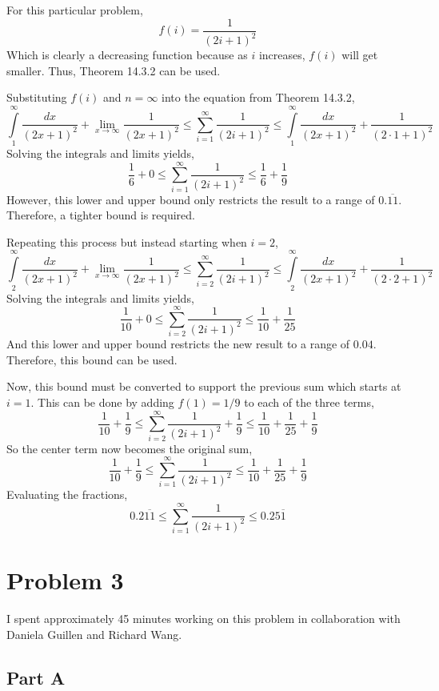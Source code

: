 \documentclass{article}
\begin{document}
For this particular problem,
$$ f(i) = \frac{1}{(2i + 1)^2} $$
Which is clearly a decreasing function because as $i$ increases, $f(i)$ will get
smaller. Thus, Theorem 14.3.2 can be used.

Substituting $f(i)$ and $n = \infty$ into the equation from Theorem 14.3.2,
$$ \int\limits_1^\infty \frac{dx}{(2x + 1)^2} + \lim_{x \to \infty} \frac{1}{(2x
+ 1)^2} \leq \sum\limits_{i=1}^{\infty} \frac{1}{(2i + 1)^2} \leq
\int\limits_1^\infty \frac{dx}{(2x + 1)^2} + \frac{1}{(2 \cdot 1 + 1)^2} $$
Solving the integrals and limits yields,
$$ \frac{1}{6} + 0 \leq \sum\limits_{i=1}^{\infty} \frac{1}{(2i + 1)^2} \leq
\frac{1}{6} + \frac{1}{9} $$
However, this lower and upper bound only restricts the result to a range of
$0.\overline{11}$. Therefore, a tighter bound is required.

Repeating this process but instead starting when $i = 2$,
$$ \int\limits_2^\infty \frac{dx}{(2x + 1)^2} + \lim_{x \to \infty} \frac{1}{(2x
+ 1)^2} \leq \sum\limits_{i=2}^{\infty} \frac{1}{(2i + 1)^2} \leq
\int\limits_2^\infty \frac{dx}{(2x + 1)^2} + \frac{1}{(2 \cdot 2 + 1)^2} $$
Solving the integrals and limits yields,
$$ \frac{1}{10} + 0 \leq \sum\limits_{i=2}^{\infty} \frac{1}{(2i + 1)^2} \leq
\frac{1}{10} + \frac{1}{25} $$
And this lower and upper bound restricts the new result to a range of $0.04$.
Therefore, this bound can be used.

Now, this bound must be converted to support the previous sum which starts at $i
= 1$. This can be done by adding $f(1) = 1/9$ to each of the three terms,
$$ \frac{1}{10} + \frac{1}{9} \leq \sum\limits_{i=2}^{\infty} \frac{1}{(2i +
1)^2} + \frac{1}{9} \leq \frac{1}{10} + \frac{1}{25} + \frac{1}{9} $$
So the center term now becomes the original sum,
$$ \frac{1}{10} + \frac{1}{9} \leq \sum\limits_{i=1}^{\infty} \frac{1}{(2i +
1)^2} \leq \frac{1}{10} + \frac{1}{25} + \frac{1}{9} $$
Evaluating the fractions,
$$ 0.2\overline{11} \leq \sum\limits_{i=1}^{\infty} \frac{1}{(2i + 1)^2} \leq
0.25\overline{1} $$

\break

\section*{Problem 3}

I spent approximately 45 minutes working on this problem in collaboration with
Daniela Guillen and Richard Wang.

\subsection*{Part A}
\end{document}
